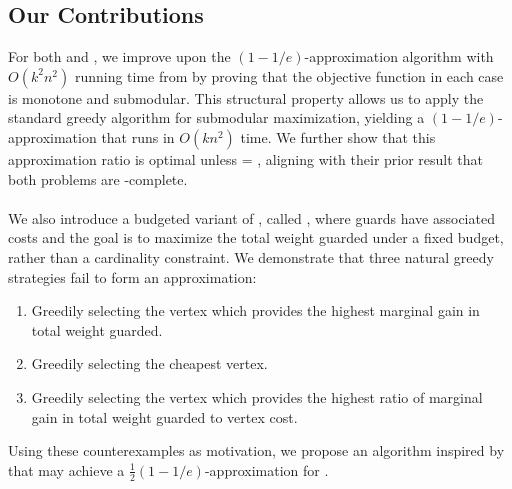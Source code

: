 \subsection{Our Contributions}
For both \MLVG{} and \MVVG{}, we improve upon the $(1-1/e)$-approximation algorithm with $O(k^2n^2)$ running time from \cite{fragoudakis-interior,fragoudakis-boundary,fragoudakis-paintings} by proving that the objective function in each case is monotone and submodular. This structural property allows us to apply the standard greedy algorithm for submodular maximization, yielding a $(1-1/e)$-approximation that runs in $O(kn^2)$ time. We further show that this approximation ratio is optimal unless  = , aligning with their prior result that both problems are -complete.\\\\
We also introduce a budgeted variant of \MVVG{}, called \BMVVG{}, where guards have associated costs and the goal is to maximize the total weight guarded under a fixed budget, rather than a cardinality constraint. We demonstrate that three natural greedy strategies fail to form an approximation:
\begin{enumerate}
    \item Greedily selecting the vertex which provides the highest marginal gain in total weight guarded.
    \item Greedily selecting the cheapest vertex.
    \item Greedily selecting the vertex which provides the highest ratio of marginal gain in total weight guarded to vertex cost.
\end{enumerate}
Using these counterexamples as motivation, we propose an algorithm inspired by \cite{khuller} that may achieve a $\frac{1}{2}(1-1/e)$-approximation for \BMVVG{}.

